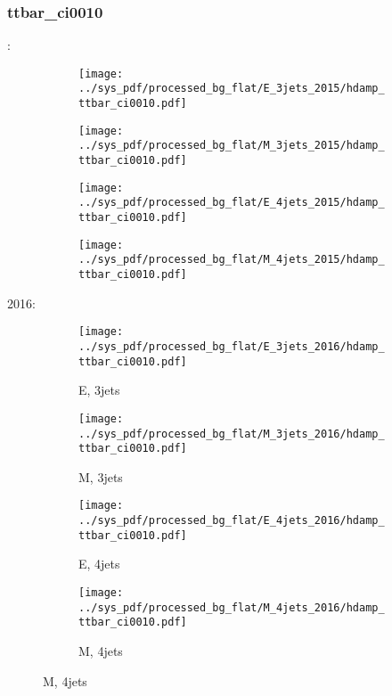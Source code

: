 \documentclass{beamer}
\begin{document}
\begin{frame}
\frametitle{ttbar_ci0010}
\fontsize{5}{1}:
\begin{figure}
\centering
\begin{subfigure}[b]{0.24\textwidth}
\texttt{[image: ../sys\_pdf/processed\_bg\_flat/E\_3jets\_2015/hdamp\_ttbar\_ci0010.pdf]}
\end{subfigure}
\begin{subfigure}[b]{0.24\textwidth}
\texttt{[image: ../sys\_pdf/processed\_bg\_flat/M\_3jets\_2015/hdamp\_ttbar\_ci0010.pdf]}
\end{subfigure}
\begin{subfigure}[b]{0.24\textwidth}
\texttt{[image: ../sys\_pdf/processed\_bg\_flat/E\_4jets\_2015/hdamp\_ttbar\_ci0010.pdf]}
\end{subfigure}
\begin{subfigure}[b]{0.24\textwidth}
\texttt{[image: ../sys\_pdf/processed\_bg\_flat/M\_4jets\_2015/hdamp\_ttbar\_ci0010.pdf]}
\end{subfigure}
\end{figure}
2016:
\begin{figure}
\centering
\begin{subfigure}[b]{0.24\textwidth}
\texttt{[image: ../sys\_pdf/processed\_bg\_flat/E\_3jets\_2016/hdamp\_ttbar\_ci0010.pdf]}
\captionsetup{font=tiny}
\caption{E, 3jets}
\end{subfigure}
\begin{subfigure}[b]{0.24\textwidth}
\texttt{[image: ../sys\_pdf/processed\_bg\_flat/M\_3jets\_2016/hdamp\_ttbar\_ci0010.pdf]}
\captionsetup{font=tiny}
\caption{M, 3jets}
\end{subfigure}
\begin{subfigure}[b]{0.24\textwidth}
\texttt{[image: ../sys\_pdf/processed\_bg\_flat/E\_4jets\_2016/hdamp\_ttbar\_ci0010.pdf]}
\captionsetup{font=tiny}
\caption{E, 4jets}
\end{subfigure}
\begin{subfigure}[b]{0.24\textwidth}
\texttt{[image: ../sys\_pdf/processed\_bg\_flat/M\_4jets\_2016/hdamp\_ttbar\_ci0010.pdf]}
\captionsetup{font=tiny}
\caption{M, 4jets}
\end{subfigure}
\end{figure}
\end{frame}
\end{document}
